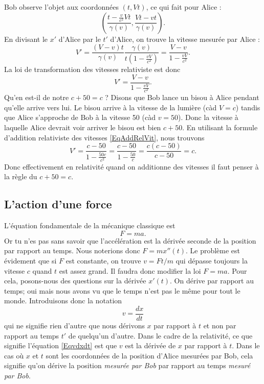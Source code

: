 \documentclass[a4paper,12pt]{book}
\theoremstyle{mes_exemples}	\newtheorem{exemple}[numtho]{Exemple}
\theoremstyle{mes_tho}
\begin{document}
Bob observe l'objet aux coordonnées $(t,Vt)$, ce qui fait pour Alice :
\[ 
  \left( \frac{ t-\frac{ v }{ c^2 }Vt }{ \gamma(v) },\frac{ Vt-vt }{ \gamma(v) } \right).
\]
En divisant le $x'$ d'Alice par le $t'$ d'Alice, on trouve la vitesse mesurée par Alice :
\[ 
  V'=\frac{ (V-v)t }{ \gamma(v) }\frac{ \gamma(v) }{ t\left( 1-\frac{ vV }{ c^2 } \right) }=\frac{ V-v }{ 1-\frac{ vV }{ c^2 } }.
\]
La loi de transformation des vitesses relativiste est donc
\begin{equation}	\label{EqAddRelVit}
V'=\frac{ V-v }{ 1-\frac{ vV }{ c^2 } }.
\end{equation}
Qu'en est-il de notre $c+50=c$ ? Disons que Bob lance un bisou à Alice pendant qu'elle arrive vers lui. Le bisou arrive à la vitesse de la lumière (càd $V=c$) tandis que Alice s'approche de Bob à la vitesse \unit{50}{\meter\per\second} (càd $v=50$). Donc la vitesse à laquelle Alice devrait voir arriver le bisou est bien $c+50$. En utilisant la formule d'addition relativiste des vitesses \eqref{EqAddRelVit}, nous trouvons
\[ 
  V'=\frac{ c-50 }{ 1-\frac{ 50c }{ c^2 } }=\frac{ c-50 }{ 1-\frac{ 50 }{ c } }=\frac{ c(c-50) }{ c-50 }=c.
\]
Donc effectivement en relativité quand on additionne des vitesses il faut penser à la règle du \og $c+50=c$\fg.

\subsection{L'action d'une force}

L'équation fondamentale de la mécanique classique est 
\[ 
  F=ma.
\]
Or tu n'es pas sans savoir que l'accélération est la dérivée seconde de la position par rapport au temps. Nous noterions donc $F=mx''(t)$. Le problème est évidement que si $F$ est constante, on trouve $v=Ft/m$ qui dépasse toujours la vitesse $c$ quand $t$ est assez grand. Il faudra donc modifier la loi $F=ma$. Pour cela, posons-nous des questions sur la dérivée $x'(t)$. On dérive par rapport au temps; oui mais nous avons vu que le temps n'est pas le même pour tout le monde. Introduisons donc la notation
\begin{equation}	\label{Eqvdxdt}
  v=\frac{ dx }{ dt }
\end{equation}
qui ne signifie rien d'autre que nous dérivons $x$ par rapport à $t$ et non par rapport au temps $t'$ de quelqu'un d'autre. Dans le cadre de la relativité, ce que signifie l'équation \eqref{Eqvdxdt} est que $v$ est la dérivée de $x$ par rapport à $t$. Dans le cas où $x$ et $t$ sont les coordonnées de la position d'Alice mesurées par Bob, cela signifie qu'on dérive la position \emph{mesurée par Bob} par rapport au temps \emph{mesuré par Bob}.
\end{document}

